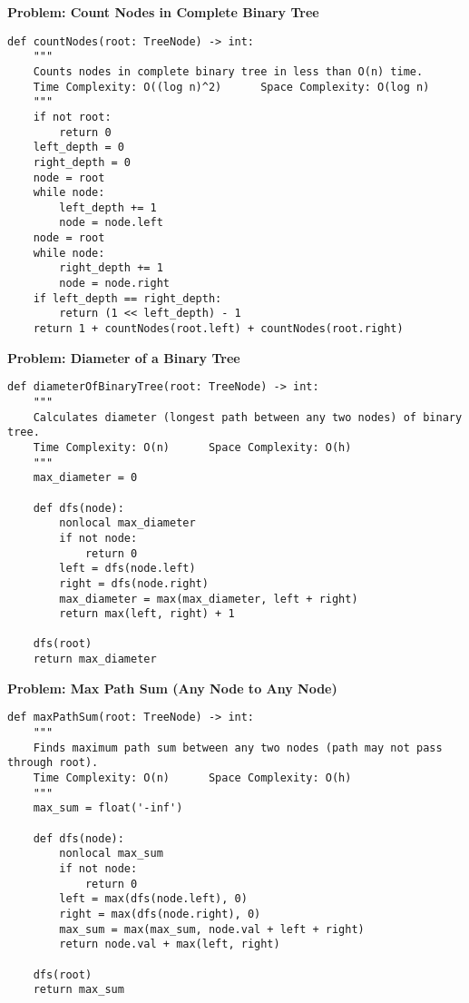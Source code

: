 \noindent\textbf{Problem: Count Nodes in Complete Binary Tree}
\begin{verbatim}
def countNodes(root: TreeNode) -> int:
    """
    Counts nodes in complete binary tree in less than O(n) time.
    Time Complexity: O((log n)^2)      Space Complexity: O(log n)
    """
    if not root:
        return 0
    left_depth = 0
    right_depth = 0
    node = root
    while node:
        left_depth += 1
        node = node.left
    node = root
    while node:
        right_depth += 1
        node = node.right
    if left_depth == right_depth:
        return (1 << left_depth) - 1
    return 1 + countNodes(root.left) + countNodes(root.right)
\end{verbatim}

\noindent\textbf{Problem: Diameter of a Binary Tree}
\begin{verbatim}
def diameterOfBinaryTree(root: TreeNode) -> int:
    """
    Calculates diameter (longest path between any two nodes) of binary tree.
    Time Complexity: O(n)      Space Complexity: O(h)
    """
    max_diameter = 0
    
    def dfs(node):
        nonlocal max_diameter
        if not node:
            return 0
        left = dfs(node.left)
        right = dfs(node.right)
        max_diameter = max(max_diameter, left + right)
        return max(left, right) + 1
    
    dfs(root)
    return max_diameter
\end{verbatim}

\noindent\textbf{Problem: Max Path Sum (Any Node to Any Node)}
\begin{verbatim}
def maxPathSum(root: TreeNode) -> int:
    """
    Finds maximum path sum between any two nodes (path may not pass through root).
    Time Complexity: O(n)      Space Complexity: O(h)
    """
    max_sum = float('-inf')
    
    def dfs(node):
        nonlocal max_sum
        if not node:
            return 0
        left = max(dfs(node.left), 0)
        right = max(dfs(node.right), 0)
        max_sum = max(max_sum, node.val + left + right)
        return node.val + max(left, right)
    
    dfs(root)
    return max_sum
\end{verbatim}

